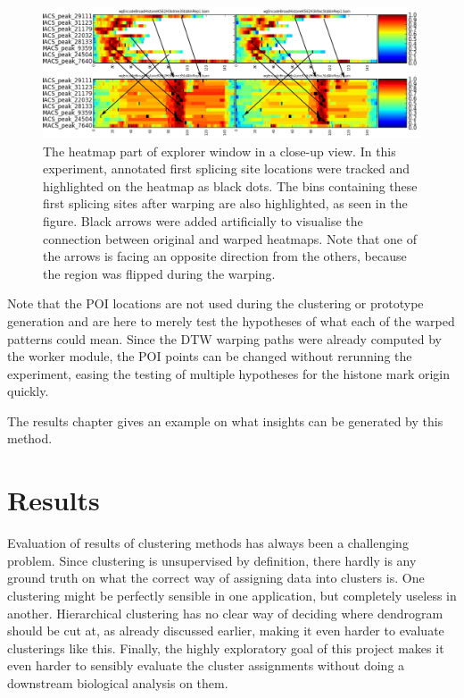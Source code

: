 \documentclass[parskip]{cs4rep}
\begin{document}
\begin{figure}
   \centering
   \includegraphics[width=\textwidth]{figures/implementation/explorer/poi_tracking.png}
   \caption{The heatmap part of explorer window in a close-up view. In this experiment, annotated first splicing site locations were tracked and highlighted on the heatmap as black dots. The bins containing these first splicing sites after warping are also highlighted, as seen in the figure. Black arrows were added artificially to visualise the connection between original and warped heatmaps. Note that one of the arrows is facing an opposite direction from the others, because the region was flipped during the warping.}  
   \label{fig:implementation:explorer:poi-tracking}
\end{figure}

Note that the POI locations are not used during the clustering or prototype generation and are here to merely test the hypotheses of what each of the warped patterns could mean. Since the DTW warping paths were already computed by the worker module, the POI points can be changed without rerunning the experiment, easing the testing of multiple hypotheses for the histone mark origin quickly.

The results chapter gives an example on what insights can be generated by this method.

\chapter{Results}
Evaluation of results of clustering methods has always been a challenging problem. Since clustering is unsupervised by definition, there hardly is any ground truth on what the correct way of assigning data into clusters is. One clustering might be perfectly sensible in one application, but completely useless in another. Hierarchical clustering has no clear way of deciding where dendrogram should be cut at, as already discussed earlier, making it even harder to evaluate clusterings like this. Finally, the highly exploratory goal of this project makes it even harder to sensibly evaluate the cluster assignments without doing a downstream biological analysis on them.
\end{document}
